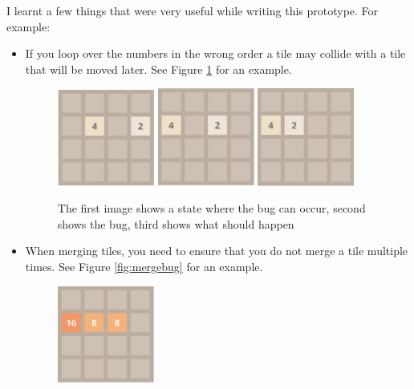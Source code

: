 \documentclass{article}
\begin{document}
I learnt a few things that were very useful while writing this prototype. For example: 
\begin{itemize}
    \item If you loop over the numbers in the wrong order a tile may collide with a tile that will be moved later. 
    See Figure \ref{fig:slidebug} for an example.
    \begin{figure}
        \centering
        \includegraphics[width=0.3\textwidth]{2048_slide.png}
        \includegraphics[width=0.3\textwidth]{2048_slide2.png}
        \includegraphics[width=0.3\textwidth]{2048_slide3.png}
        \caption{The first image shows a state where the bug can occur, second shows the bug, third shows what should happen}
        \label{fig:slidebug}
    \end{figure}
    \item When merging tiles, you need to ensure that you do not merge a tile multiple times. See Figure \ref{fig:mergebug} for an example.
    \begin{figure}
        \centering
        \includegraphics[width=0.3\textwidth]{2048_merge.png}

\end{figure}
\end{itemize}
\end{document}
